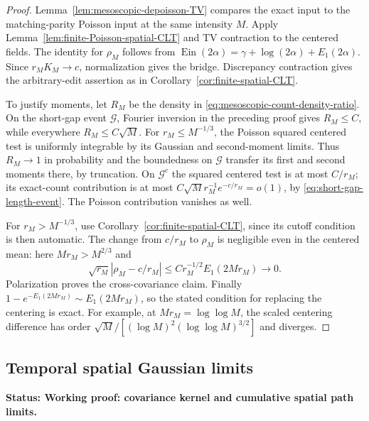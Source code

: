 \documentclass[11pt,letterpaper]{article}
\newcommand{\status}[1]{\textbf{Status: #1.}}
\begin{document}
\begin{proof}
Lemma~\ref{lem:mesoscopic-depoisson-TV} compares the exact input
to the matching-parity Poisson input at the same intensity $M$.
Apply Lemma~\ref{lem:finite-Poisson-spatial-CLT} and TV contraction
to the centered fields. The identity for $\rho_M$ follows from
$\operatorname{Ein}(2\alpha)=\gamma+\log(2\alpha)+E_1(2\alpha)$.
Since $r_MK_M\to c$, normalization gives the bridge. Discrepancy
contraction gives the arbitrary-edit assertion as in
Corollary~\ref{cor:finite-spatial-CLT}.

To justify moments, let $R_M$ be the density in
\eqref{eq:mesoscopic-count-density-ratio}. On the short-gap event
$\mathcal G$, Fourier inversion in the preceding proof gives
$R_M\le C$, while everywhere $R_M\le C\sqrt M$.
For $r_M\le M^{-1/3}$, the Poisson squared centered test is
uniformly integrable by its Gaussian and second-moment limits.
Thus $R_M\to1$ in probability and the boundedness on $\mathcal G$
transfer its first and second moments there, by truncation.
On $\mathcal G^c$ the squared centered test is at most $C/r_M$;
its exact-count contribution is at most
$C\sqrt M r_M^{-1}e^{-c/r_M}=o(1)$, by
\eqref{eq:short-gap-length-event}. The Poisson contribution
vanishes as well.

For $r_M>M^{-1/3}$, use
Corollary~\ref{cor:finite-spatial-CLT}, since its cutoff condition
is then automatic. The change from $c/r_M$ to $\rho_M$ is
negligible even in the centered mean: here $Mr_M>M^{2/3}$ and
\[
 \sqrt{r_M}|\rho_M-c/r_M|
       \le C r_M^{-1/2}E_1(2Mr_M)\longrightarrow0.
\]
Polarization proves the cross-covariance claim. Finally
$1-e^{-E_1(2Mr_M)}\sim E_1(2Mr_M)$, so the stated condition for
replacing the centering is exact. For example, at
$Mr_M=\log\log M$, the scaled centering difference has order
$\sqrt M/[(\log M)^2(\log\log M)^{3/2}]$ and diverges.
\end{proof}

\subsection{Temporal spatial Gaussian limits}
\label{sec:temporal-spatial-CLT}

\status{Working proof: covariance kernel and cumulative spatial path limits}
\end{document}

